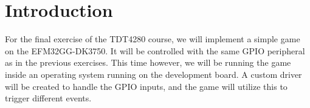 \chapter{Introduction}

For the final exercise of the TDT4280 course, we will implement a simple game on the EFM32GG-DK3750.
It will be controlled with the same GPIO peripheral as in the previous exercises.
This time however, we will be running the game inside an operating system running on the development board.
A custom driver will be created to handle the GPIO inputs, and the game will utilize this to trigger different events.

